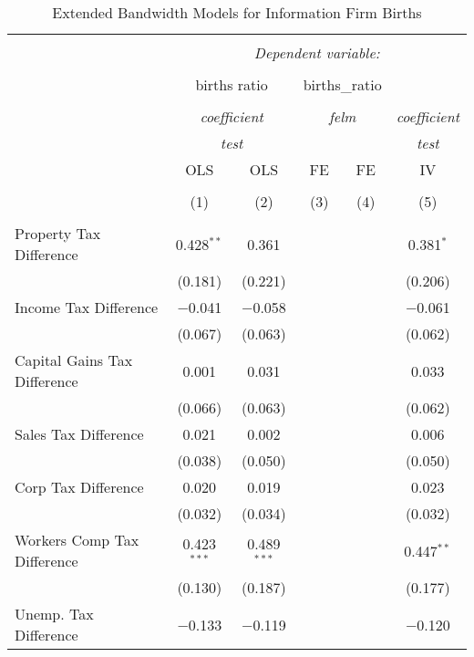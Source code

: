 
\begin{table}[!htbp] \centering 
  \caption{Extended Bandwidth Models for  Information Firm Births} 
  \label{} 
\begin{tabular}{@{\extracolsep{5pt}}lccccc} 
\\[-1.8ex]\hline 
\hline \\[-1.8ex] 
 & \multicolumn{5}{c}{\textit{Dependent variable:}} \\ 
\cline{2-6} 
\\[-1.8ex] & \multicolumn{2}{c}{births ratio} & \multicolumn{2}{c}{births\_ratio} &   \\ 
\\[-1.8ex] & \multicolumn{2}{c}{\textit{coefficient}} & \multicolumn{2}{c}{\textit{felm}} & \textit{coefficient} \\ 
 & \multicolumn{2}{c}{\textit{test}} & \multicolumn{2}{c}{\textit{}} & \textit{test} \\ 
 & OLS & OLS & FE & FE & IV \\ 
\\[-1.8ex] & (1) & (2) & (3) & (4) & (5)\\ 
\hline \\[-1.8ex] 
 Property Tax Difference & 0.428$^{**}$ & 0.361 &  &  & 0.381$^{*}$ \\ 
  & (0.181) & (0.221) &  &  & (0.206) \\ 
  Income Tax Difference & $-$0.041 & $-$0.058 &  &  & $-$0.061 \\ 
  & (0.067) & (0.063) &  &  & (0.062) \\ 
  Capital Gains Tax Difference & 0.001 & 0.031 &  &  & 0.033 \\ 
  & (0.066) & (0.063) &  &  & (0.062) \\ 
  Sales Tax Difference & 0.021 & 0.002 &  &  & 0.006 \\ 
  & (0.038) & (0.050) &  &  & (0.050) \\ 
  Corp Tax Difference & 0.020 & 0.019 &  &  & 0.023 \\ 
  & (0.032) & (0.034) &  &  & (0.032) \\ 
  Workers Comp Tax Difference & 0.423$^{***}$ & 0.489$^{***}$ &  &  & 0.447$^{**}$ \\ 
  & (0.130) & (0.187) &  &  & (0.177) \\ 
  Unemp. Tax Difference & $-$0.133 & $-$0.119 &  &  & $-$0.120 \\ 

\end{tabular}
\end{table}
